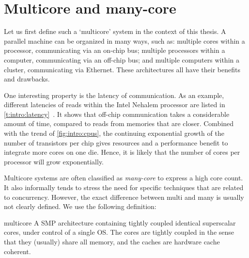 \section{Multicore and many-core}

Let us first define such a `multicore' system in the context of this thesis.
A parallel machine can be organized in many ways, such as:
multiple cores within a processor, communicating via an on-chip bus;
multiple processors within a computer, communicating via an off-chip bus; and
multiple computers within a cluster, communicating via Ethernet.
These architectures all have their benefits and drawbacks.

One interesting property is the latency of communication.
As an example, different latencies of reads within the Intel Nehalem processor are listed in \vref{t:intro:latency}~\cite{molka:memory_performance}.
It shows that off-chip communication takes a considerable amount of time, compared to reads from memories that are closer.
Combined with the trend of \vref{fig:intro:cpus}, the continuing exponential growth of the number of transistors per chip gives resources and a performance benefit to integrate more cores on one die.
Hence, it is likely that the number of cores per processor will grow exponentially.


Multicore systems are often classified as \emph{many-core} to express a high core count.
It also informally tends to stress the need for specific techniques that are related to concurrency.
However, the exact difference between multi and many is usually not clearly defined.
We use the following definition:

\begin{describe}{multicore}
	A \ac{SMP} architecture containing tightly coupled identical superscalar cores, under control of a single \ac{OS}.
	The cores are tightly coupled in the sense that they (usually) share all memory, and the caches are hardware cache coherent.
\end{describe}

